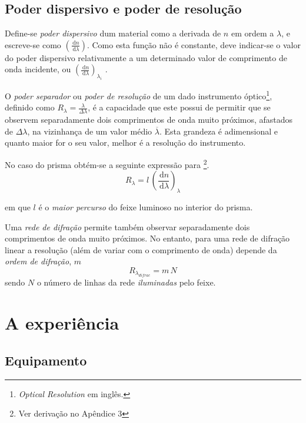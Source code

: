 \documentclass[a4paper,12pt]{article}  %
\newcommand{\ud}{\,\mathrm{d}}
\begin{document}
\subsection{Poder dispersivo e poder de resolução}
Define-se \emph{poder dispersivo} dum material como a derivada de $n$ em ordem a $\lambda$, e escreve-se  como $\left( \frac{\ud n}{\ud \lambda } \right)$. Como esta função não é constante, deve indicar-se o valor do poder dispersivo relativamente a um determinado valor de comprimento de onda incidente, ou $\left( \frac{\ud n}{\ud \lambda } \right)_{\lambda_i}$ .

O \emph{poder separador} ou \emph{poder de resolução} de um dado instrumento óptico\footnote{\emph{Optical Resolution} em inglês.}, definido como $R_\lambda = \frac{\lambda}{\Delta \lambda} $,  é a capacidade que este possui de permitir que se observem separadamente dois comprimentos de onda muito próximos, afastados de $\Delta \lambda$, na vizinhança de um valor médio $\overline{\lambda}$. Esta grandeza é adimensional e quanto maior for o seu valor, melhor é a resolução do instrumento.

No caso do prisma obtém-se a seguinte expressão para \footnote{Ver derivação no Apêndice 3}.
 \begin{equation}
	\label{eq:resolu}
	R_\lambda = l\,\left(\frac{\ud n}{\ud \lambda} \right)_\lambda 
\end{equation}

em que $l$ é o \emph{maior percurso} do feixe luminoso no interior do prisma.

Uma \emph{rede de difração}
permite também observar separadamente dois comprimentos de onda muito próximos.
No entanto, para uma rede de difração linear a resolução (além de variar com o comprimento de onda) depende da \emph{ordem de difração}, $m$
 \begin{equation}
	\label{eq:resoludrifa}
	R_{\lambda_{difrac}} = m\,N 
\end{equation}
sendo $N$  o número de linhas da rede \emph{iluminadas} pelo feixe.


\section{\sf A experiência}
\subsection{\sf Equipamento}
\end{document}
